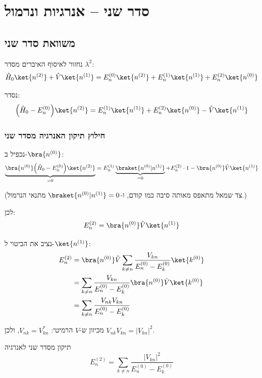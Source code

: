 \section{סדר שני – אנרגיות ונרמול}

\subsection{משוואת סדר שני}

נחזור לאיסוף האיברים מסדר $\lambda^2$:
\[
\hat{H}_0\ket{n^{(2)}} + \hat{V}\ket{n^{(1)}} = E_n^{(0)}\ket{n^{(2)}} + E_n^{(1)}\ket{n^{(1)}} + E_n^{(2)}\ket{n^{(0)}}
\]

נסדר:
\begin{equation}\label{eq:second_order}
\Big(\hat{H}_0 - E_n^{(0)}\Big)\ket{n^{(2)}} = E_n^{(1)}\ket{n^{(1)}} + E_n^{(2)}\ket{n^{(0)}} - \hat{V}\ket{n^{(1)}}
\end{equation}

\subsubsection{חילוץ תיקון האנרגיה מסדר שני}

נכפיל ב-$\bra{n^{(0)}}$:
\[
\underbrace{\bra{n^{(0)}}\Big(\hat{H}_0 - E_n^{(0)}\Big)\ket{n^{(2)}}}_{=0} = E_n^{(1)}\underbrace{\braket{n^{(0)}|n^{(1)}}}_{=0} + E_n^{(2)}\cdot 1 - \bra{n^{(0)}}\hat{V}\ket{n^{(1)}}
\]

(צד שמאל מתאפס מאותה סיבה כמו קודם, ו-$\braket{n^{(0)}|n^{(1)}}=0$ מתנאי הנרמול.)

לכן:
\[
E_n^{(2)} = \bra{n^{(0)}}\hat{V}\ket{n^{(1)}}
\]

נציב את הביטוי ל-$\ket{n^{(1)}}$:
\begin{align}
E_n^{(2)} &= \bra{n^{(0)}}\hat{V}\sum_{k\neq n}\frac{V_{kn}}{E_n^{(0)}-E_k^{(0)}}\ket{k^{(0)}} \\
&= \sum_{k\neq n}\frac{V_{kn}}{E_n^{(0)}-E_k^{(0)}}\bra{n^{(0)}}\hat{V}\ket{k^{(0)}} \\
&= \sum_{k\neq n}\frac{V_{nk}V_{kn}}{E_n^{(0)}-E_k^{(0)}}
\end{align}

מכיוון ש-$\hat{V}$ הרמיטי: $V_{nk} = V_{kn}^*$, ולכן $V_{nk}V_{kn} = |V_{kn}|^2$.

\begin{resultbox}{תיקון מסדר שני לאנרגיה}
\[
\boxed{E_n^{(2)} = \sum_{k\neq n}\frac{|V_{kn}|^2}{E_n^{(0)}-E_k^{(0)}}}
\]
\end{resultbox}

